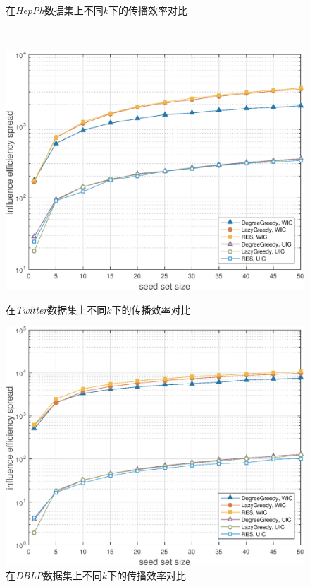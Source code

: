 \begin{figure}[!ht]
\begin {minipage}{0.48\textwidth}
     \caption{在\textit{HepPh}数据集上不同$k$下的传播效率对比}
     \label{fig:hepPhEff}
   \end{minipage}
   \\
   \begin{minipage}{0.48\textwidth}
     \centering
     \includegraphics[width=\linewidth]{figures/twitterEff.eps}
     \caption{在\textit{Twitter}数据集上不同$k$下的传播效率对比}
     \label{fig:twitterEff}
   \end{minipage}
   \hfill
   \begin {minipage}{0.48\textwidth}
     \centering
     \includegraphics[width=\linewidth]{figures/dblpEff.eps}
     \caption{在\textit{DBLP}数据集上不同$k$下的传播效率对比}
     \label{fig:dblpEff}
   \end{minipage}
\end{figure}

